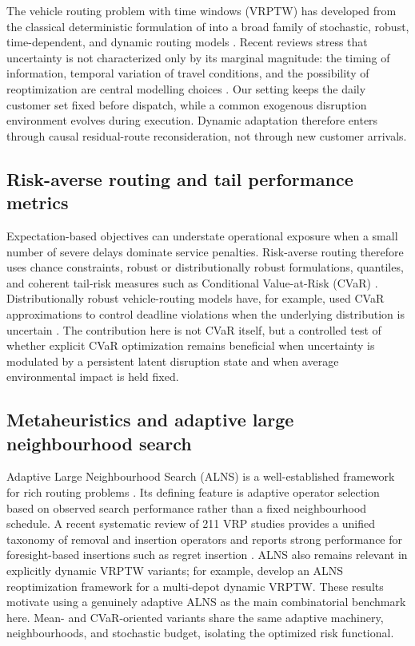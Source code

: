 \documentclass[preprint,12pt]{elsarticle}
\newcommand{\1}{\mathbf{1}}
\begin{document}
The vehicle routing problem with time windows (VRPTW) has developed from the
classical deterministic formulation of \citet{Solomon1987} into a broad family
of stochastic, robust, time-dependent, and dynamic routing models
\citep{TothVigo2002, Laporte2009, BraysyGendreau2005}.
Recent reviews stress that uncertainty is not characterized only by its marginal
magnitude: the timing of information, temporal variation of travel conditions,
and the possibility of reoptimization are central modelling choices
\citep{Ritzinger2016, ZhangVanWoensel2023, Mardesic2024, Adamo2024}.
Our setting keeps the daily customer set fixed before dispatch, while a common
exogenous disruption environment evolves during execution. Dynamic adaptation
therefore enters through causal residual-route reconsideration, not through
new customer arrivals.

\subsection{Risk-averse routing and tail performance metrics}

Expectation-based objectives can understate operational exposure when a small
number of severe delays dominate service penalties. Risk-averse routing therefore
uses chance constraints, robust or distributionally robust formulations, quantiles,
and coherent tail-risk measures such as Conditional Value-at-Risk (CVaR)
\citep{RockafellarUryasev2000}. Distributionally robust vehicle-routing models have,
for example, used CVaR approximations to control deadline violations when the
underlying distribution is uncertain \citep{ZhangEtAl2021DRODeadlines}.
The contribution here is not CVaR itself, but a controlled test of whether explicit
CVaR optimization remains beneficial when uncertainty is modulated by a persistent
latent disruption state and when average environmental impact is held fixed.

\subsection{Metaheuristics and adaptive large neighbourhood search}

Adaptive Large Neighbourhood Search (ALNS) is a well-established framework for
rich routing problems \citep{Ropke2006ALNS}. Its defining feature is adaptive
operator selection based on observed search performance rather than a fixed
neighbourhood schedule. A recent systematic review of 211 VRP studies provides a
unified taxonomy of removal and insertion operators and reports strong performance
for foresight-based insertions such as regret insertion \citep{Voigt2025ALNS}.
ALNS also remains relevant in explicitly dynamic VRPTW variants; for example,
\citet{WangSunHuang2024} develop an ALNS reoptimization framework for a multi-depot
dynamic VRPTW. These results motivate using a genuinely adaptive ALNS as the main
combinatorial benchmark here. Mean- and CVaR-oriented variants share the same
adaptive machinery, neighbourhoods, and stochastic budget, isolating the optimized
risk functional.
\end{document}

